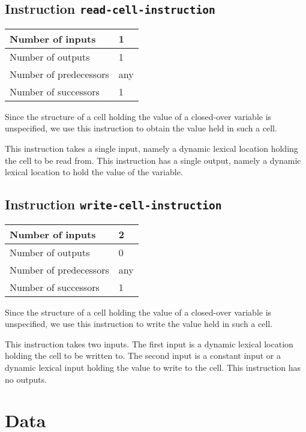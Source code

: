 \subsection{Instruction \texttt{read-cell-instruction}}
\label{mir-instruction-read-cell}

\begin{tabular}{|l|l|}
\hline
Number of inputs & 1\\
\hline
Number of outputs & 1\\
\hline
Number of predecessors & any\\
\hline
Number of successors & 1\\
\hline
\end{tabular}

Since the structure of a cell holding the value of a closed-over
variable is unspecified, we use this instruction to obtain the value
held in such a cell.

This instruction takes a single input, namely a dynamic lexical
location holding the cell to be read from.  This instruction has a
single output, namely a dynamic lexical location to hold the value of
the variable.

\subsection{Instruction \texttt{write-cell-instruction}}
\label{mir-instruction-write-cell}

\begin{tabular}{|l|l|}
\hline
Number of inputs & 2\\
\hline
Number of outputs & 0\\
\hline
Number of predecessors & any\\
\hline
Number of successors & 1\\
\hline
\end{tabular}

Since the structure of a cell holding the value of a closed-over
variable is unspecified, we use this instruction to write the value
held in such a cell.

This instruction takes two inputs. The first input is a dynamic
lexical location holding the cell to be written to.  The second input
is a constant input or a dynamic lexical input holding the value to
write to the cell.  This instruction has no outputs.

\section{Data}

